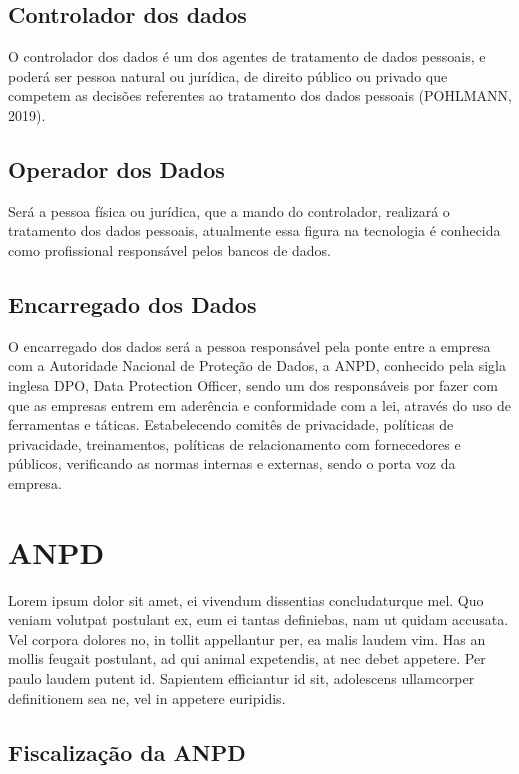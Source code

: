 \documentclass[
	12pt,				%
	openright,			%
	oneside,			%
	a4paper,			%
	english,			%
	french,				%
	spanish,			%
	brazil,				%
	]{abntex2}
\begin{document}
\subsection{Controlador dos dados}

O controlador dos dados é um dos agentes de tratamento de dados pessoais, e poderá ser pessoa natural ou jurídica, de direito público ou privado que competem as decisões referentes ao tratamento dos dados pessoais (POHLMANN, 2019).


\subsection{Operador dos Dados}

Será a pessoa física ou jurídica, que a mando do controlador, realizará o tratamento dos dados pessoais, atualmente essa figura na tecnologia é conhecida como profissional responsável pelos bancos de dados.


\subsection{Encarregado dos Dados}

O encarregado dos dados será a pessoa responsável pela ponte entre a empresa com a Autoridade Nacional de Proteção de Dados, a ANPD, conhecido pela sigla inglesa DPO, Data Protection Officer, sendo um dos responsáveis por fazer com que as empresas entrem em aderência e conformidade com a lei, através do uso de ferramentas e táticas.
Estabelecendo comitês de privacidade, políticas de privacidade, treinamentos, políticas de relacionamento com fornecedores e públicos, verificando as normas internas e externas, sendo o porta voz da empresa. 


\section{ANPD}
\label{sec: exemplo}

Lorem ipsum dolor sit amet, ei vivendum dissentias concludaturque mel. Quo veniam volutpat postulant ex, eum ei tantas definiebas, nam ut quidam accusata. Vel corpora dolores no, in tollit appellantur per, ea malis laudem vim. Has an mollis feugait postulant, ad qui animal expetendis, at nec debet appetere. Per paulo laudem putent id. Sapientem efficiantur id sit, adolescens ullamcorper definitionem sea ne, vel in appetere euripidis.

\subsection{Fiscalização da ANPD}
\end{document}
